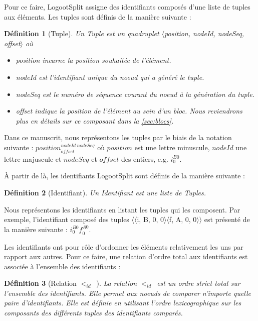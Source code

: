 \documentclass[12pt]{thesul}
\newtheorem{definition}{Définition}
\newcommand{\eg}{e.g. }
\newcommand{\trm}[1]{\mathit{#1}}
\newcommand{\id}[3]{$\trm{#1}^{\trm{#2}}_{\trm{#3}}$}
\newcommand{\lid}{$<_{id}$~}
\begin{document}
Pour ce faire, LogootSplit assigne des identifiants composés d'une liste de tuples aux éléments.
Les tuples sont définis de la manière suivante :

\begin{definition}[Tuple]
  Un \emph{Tuple} est un quadruplet $\langle$position, nodeId, nodeSeq, offset$\rangle$ où
  \begin{itemize}
    \item position incarne la position souhaitée de l'élément.
    \item nodeId est l'identifiant unique du noeud qui a généré le tuple.
    \item nodeSeq est le numéro de séquence courant du noeud à la génération du tuple.
    \item offset indique la position de l'élément au sein d'un bloc. Nous reviendrons plus en détails sur ce composant dans la \autoref{sec:blocs}.
  \end{itemize}
\end{definition}


Dans ce manuscrit, nous représentons les tuples par le biais de la notation suivante : \id{position}{nodeId~nodeSeq}{offset} où $\trm{position}$ est une lettre minuscule, $\trm{nodeId}$ une lettre majuscule et $\trm{nodeSeq}$ et $\trm{offset}$ des entiers, \eg \id{i}{B0}{0}.

À partir de là, les identifiants LogootSplit sont définis de la manière suivante :

\begin{definition}[Identifiant]
  Un \emph{Identifiant} est une liste de \emph{Tuples}.
\end{definition}


Nous représentons les identifiants en listant les tuples qui les composent.
Par exemple, l'identifiant composé des tuples $\langle\langle$i, B, 0, 0$\rangle\langle$f, A, 0, 0$\rangle\rangle$ est présenté de la manière suivante : \id{i}{B0}{0}\id{f}{A0}{0}.

Les identifiants ont pour rôle d'ordonner les éléments relativement les uns par rapport aux autres.
Pour ce faire, une relation d'ordre total aux identifiants est associée à l'ensemble des identifiants :

\begin{definition}[Relation \lid]
  La relation \lid est un ordre strict total sur l'ensemble des identifiants.
  Elle permet aux noeuds de comparer n'importe quelle paire d'identifiants.
  Elle est définie en utilisant l'ordre lexicographique sur les composants des différents tuples des identifiants comparés.
\end{definition}
\end{document}
